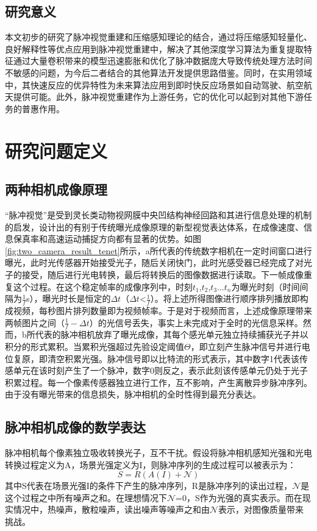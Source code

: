 \subsection{研究意义}
本文初步的研究了脉冲视觉重建和压缩感知理论的结合，通过将压缩感知轻量化、良好解释性等优点应用到脉冲视觉重建中，解决了其他深度学习算法为重复提取特征通过大量卷积带来的模型迅速膨胀和优化了脉冲数据庞大导致传统处理方法时间不敏感的问题，为今后二者结合的其他算法开发提供思路借鉴。同时，在实用领域中，其快速反应的优异特性为未来算法应用到即时快反应场景如自动驾驶、航空航天提供可能。此外，脉冲视觉重建作为上游任务，它的优化可以起到对其他下游任务的普惠作用。


\section{研究问题定义}
\subsection{两种相机成像原理}
“脉冲视觉”是受到灵长类动物视网膜中央凹结构神经回路和其进行信息处理的机制的启发，设计出的有别于传统曝光成像原理的新型视觉表达体系，在成像速度、信息保真率和高速运动捕捉方向都有显著的优势。如图\ref{fig:two_camera_result_tenet}所示，a所代表的传统数字相机在一定时间窗口进行曝光，此时光传感器开始接受光子，随后关闭快门，此时光感受器已经完成了对光子的接受，随后进行光电转换，最后将转换后的图像数据进行读取。下一帧成像重复这个过程。在这个稳定帧率的成像序列中，时刻$t_1$,$t_2$,$t_3$...$t_n$为曝光时刻（时间间隔为$\frac{1}{f}$s），曝光时长是恒定的$\Delta t$（$\Delta t$<$\frac{1}{f}$）。将上述所得图像进行顺序排列播放即构成视频，每秒图片排列数量即为视频帧率。于是对于视频而言，上述成像原理带来两帧图片之间（$\frac{1}{f}-\Delta t$）的光信号丢失，事实上未完成对于全时的光信息采样。然而，b所代表的脉冲相机放弃了曝光成像，其每个感光单元独立持续捕获光子并以积分的形式累积。当累积光强超过先验设定阈值$\Theta$，即立刻产生脉冲信号并进行电位复原，即清空积累光强。脉冲信号即以比特流的形式表示，其中数字1代表该传感单元在该时刻产生了一个脉冲，数字0则反之，表示此刻该传感单元仍处于光子积累过程。每一个像素传感器独立进行工作，互不影响，产生离散异步脉冲序列。由于没有曝光带来的信息损失，脉冲相机的全时性得到最充分表达。
\subsection{脉冲相机成像的数学表达}
脉冲相机每个像素独立吸收转换光子，互不干扰。假设将脉冲相机感知光强和光电转换过程定义为A，场景光强定义为I，则脉冲序列的生成过程可以被表示为：
\begin{equation}
  \label{eq:1}
    S=R(A(I)+\mathcal{N})
\end{equation}
其中S代表在场景光强I的条件下产生的脉冲序列，R是脉冲序列的读出过程，$\mathcal{N}$是这个过程之中所有噪声之和。在理想情况下$\mathcal{N}$=0，S作为光强的真实表示。而在现实情况中，热噪声，散粒噪声，读出噪声等噪声之和由$\mathcal{N}$表示，对图像质量带来挑战。

